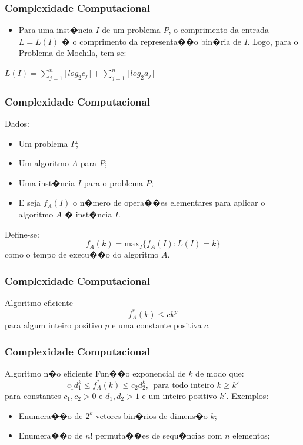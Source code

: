 \documentclass[fleqn]{beamer}
\begin{document}
\begin{frame}
	\frametitle{Complexidade Computacional}
	\begin{itemize}
		\item Para uma inst�ncia $I$ de um problema $P$, o comprimento da entrada  $L=L(I)$ � o comprimento da representa��o bin�ria de $I$. Logo, para o Problema de Mochila, tem-se:
	\end{itemize}
	\center
	$L(I)=\sum_{j=1}^{n}\lceil log_2c_j \rceil + \sum_{j=1}^{n}\lceil log_2 a_j \rceil$

\end{frame}
\begin{frame}
	\frametitle{Complexidade Computacional}
	Dados:
	\begin{itemize}
		\item Um problema $P$;
		\item Um algoritmo $A$ para $P$;
		\item Uma inst�ncia $I$ para o problema $P$;
		\item E seja $f_A(I)$ o n�mero de opera��es elementares para aplicar o algoritmo $A$ � inst�ncia $I$.		
	\end{itemize}
	Define-se:
	$$
		f_A(k)=\textrm{max}_I\{f_A(I):L(I)=k\}
	$$
	como o tempo de execu��o do algoritmo $A$.
\end{frame}
\begin{frame}
	\frametitle{Complexidade Computacional}
	\begin{block}{Algoritmo eficiente}
		$$
			f_A^*(k) \leq ck^p
		$$
		para algum inteiro positivo $p$ e uma constante positiva $c$.
	\end{block}
\end{frame}
\begin{frame}
	\frametitle{Complexidade Computacional}
	\begin{block}{Algoritmo n�o eficiente}
		Fun��o exponencial de $k$ de modo que:
		$$
			c_1d_1^k\leq f_A^*(k) \leq c_2d_2^k,~~\textrm{para todo inteiro } k \geq k'                                                                    
		$$
		para constantes $c_1, c_2 > 0$ e $d_1, d_2 > 1$ e um inteiro positivo $k'$.
		\newline
		\newline		
		Exemplos:
		\begin{itemize}
			\item Enumera��o de $2^k$ vetores bin�rios de dimens�o $k$;
			\item Enumera��o de $n!$ permuta��es de sequ�ncias com $n$ elementos;
		\end{itemize}
	\end{block}
\end{frame}
\end{document}
